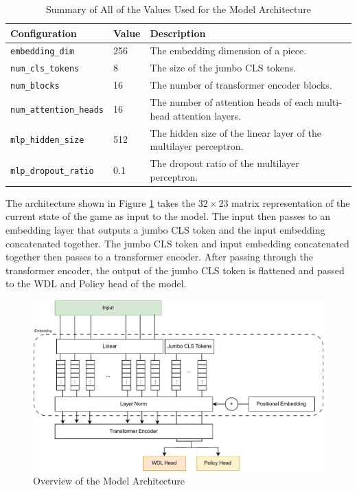\begin{table}[H]
  \centering
  \begin{tabular}{llp{7.5cm}}
    \hline 
    Configuration              & Value & Description                                                         \\ \hline
    \verb|embedding_dim|       & 256   & The embedding dimension of a piece.                                 \\
    \verb|num_cls_tokens|      & 8     & The size of the jumbo CLS tokens.                                   \\
    \verb|num_blocks|          & 16    & The number of transformer encoder blocks.                           \\
    \verb|num_attention_heads| & 16    & The  number of attention heads of each multi-head attention layers. \\
    \verb|mlp_hidden_size|     & 512   & The hidden size of the linear layer of the multilayer perceptron.   \\
    \verb|mlp_dropout_ratio|   & 0.1   & The dropout ratio of the multilayer perceptron.                     \\ \hline
  \end{tabular}
  \caption{Summary of All of the Values Used for the Model Architecture}
  \label{tab:model-configuration-summary}
\end{table}

The architecture shown in Figure \ref{fig:jumbo-vit} takes the $32 \times 23$ matrix representation of the current state of the game as input to the model. The input then passes to an embedding layer that outputs a jumbo CLS token and the input embedding concatenated together. The jumbo CLS token and input embedding concatenated together then passes to a transformer encoder. After passing through the transformer encoder, the output of the jumbo CLS token is flattened and passed to the WDL and Policy head of the model.

\begin{figure}[H]
    \centering
    \includegraphics[width=\linewidth]{images/JumboViT.pdf}
    \caption{Overview of the Model Architecture}
    \label{fig:jumbo-vit}
\end{figure}

